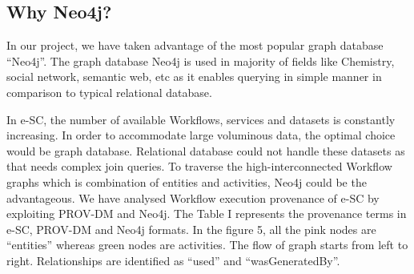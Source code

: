 \documentclass[10pt,conference,twocolumn]{IEEEtran}
\begin{document}
\subsection{Why Neo4j?}
In our project, we have taken advantage of the most popular graph database \enquote{Neo4j}.  The graph database Neo4j is used in majority of fields like Chemistry, social network, semantic web, etc as it enables querying in simple manner in comparison to typical relational database. \newline

In e-SC, the number of available Workflows, services and datasets is constantly increasing. In order to accommodate large voluminous data, the optimal choice would be graph database.
Relational database could not handle these datasets as that needs complex join queries. To traverse the high-interconnected Workflow graphs which is  combination of entities and activities, Neo4j could be the advantageous. We have analysed Workflow execution provenance of  e-SC by exploiting PROV-DM and Neo4j. The Table I represents the provenance terms in e-SC, PROV-DM and Neo4j formats. In the figure 5, all the pink nodes are \enquote{entities} whereas green nodes are activities. The flow of graph starts from left to right. Relationships are identified as \enquote{used}  and \enquote{wasGeneratedBy}.
\end{document}

